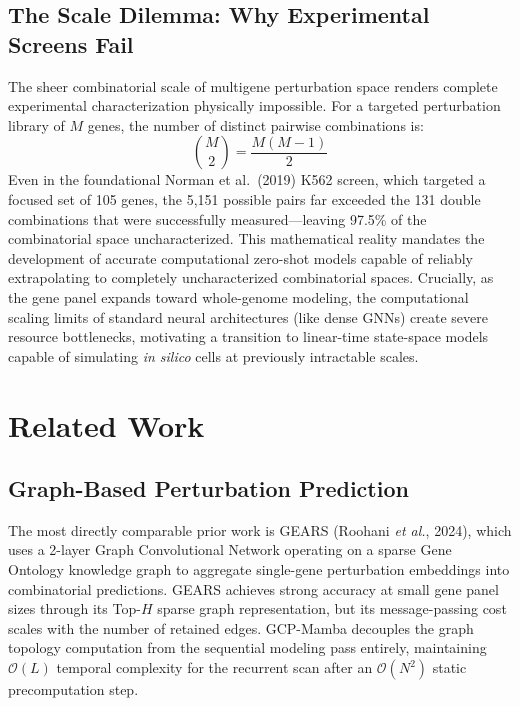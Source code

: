 \documentclass{bioinfo}
\begin{document}
\subsection{The Scale Dilemma: Why Experimental Screens Fail}

The sheer combinatorial scale of multigene perturbation space renders complete experimental characterization physically impossible. For a targeted perturbation library of $M$ genes, the number of distinct pairwise combinations is:
\begin{equation}
\binom{M}{2} = \frac{M(M-1)}{2}
\end{equation}
Even in the foundational Norman et al.\ (2019) K562 screen, which targeted a focused set of 105 genes, the 5{,}151 possible pairs far exceeded the 131 double combinations that were successfully measured—leaving 97.5\% of the combinatorial space uncharacterized. This mathematical reality mandates the development of accurate computational zero-shot models capable of reliably extrapolating to completely uncharacterized combinatorial spaces. Crucially, as the gene panel expands toward whole-genome modeling, the computational scaling limits of standard neural architectures (like dense GNNs) create severe resource bottlenecks, motivating a transition to linear-time state-space models capable of simulating \textit{in silico} cells at previously intractable scales.

\section{Related Work}

\subsection{Graph-Based Perturbation Prediction}

The most directly comparable prior work is GEARS (Roohani \textit{et al.}, 2024), which uses a 2-layer Graph Convolutional Network operating on a sparse Gene Ontology knowledge graph to aggregate single-gene perturbation embeddings into combinatorial predictions. GEARS achieves strong accuracy at small gene panel sizes through its Top-$H$ sparse graph representation, but its message-passing cost scales with the number of retained edges. GCP-Mamba decouples the graph topology computation from the sequential modeling pass entirely, maintaining $\mathcal{O}(L)$ temporal complexity for the recurrent scan after an $\mathcal{O}(N^2)$ static precomputation step.
\end{document}
